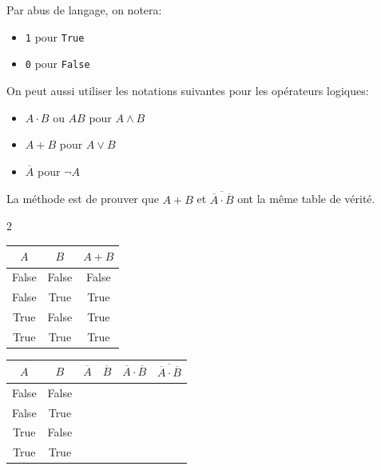 \pagebreak

\begin{propriete}[Notations]{}
 Par abus de langage, on notera:
\begin{itemize}
	\item \verb|1| pour \verb|True|
	\item \verb|0| pour \verb|False|
\end{itemize}

On peut aussi utiliser les notations suivantes pour les opérateurs logiques:
\begin{itemize}
	\item $A \cdot B$ ou $AB$ pour $A \wedge B$
	\item $A + B$ pour $A \vee B$
	\item $\overline{A}$ pour $\neg A$
\end{itemize}
\end{propriete}

\begin{exercice_cours}{}

La méthode est de prouver que $A + B$ et $\overline{\overline{A} \cdot \overline{B}}$ ont la même table de vérité.

\begin{multicols}{2}
\renewcommand{\arraystretch}{1.3}
\begin{tabular}{ccc}
	\hline
	$A$ & $B$ & $A + B$ \\
	\hline
	False & False & False \\
	False & True & True \\
	True & False & True \\
	True & True & True \\
	\hline
	

\end{tabular}

\columnbreak
\renewcommand{\arraystretch}{1.3}
\begin{tabular}{cc|p{1.2cm}|p{1.2cm}|p{1.2cm}|p{1.2cm}|}
	\hline
	$A$ & $B$ & $\overline{A}$ & $\overline{B}$ & $\overline{A} \cdot \overline{B} $ & $\overline{\overline{A} \cdot \overline{B}}$ \\
	\hline
	False & False &  &  &  &  \\
	False & True &  &  &  &  \\
	True & False &  &  &  &  \\
	True & True &  &  &  &  \\
	\hline
\end{tabular}
\end{multicols}

\end{exercice_cours}

